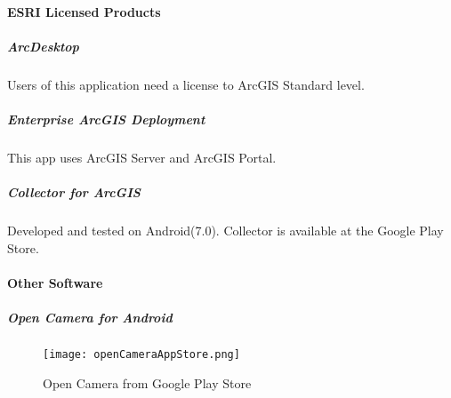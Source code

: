 \documentclass[class=article , crop=false, titlepage, twoside, multi={itemize, figure, verbatim}, float=false]{standalone}
\begin{document}
\paragraph{ESRI Licensed Products}
\subparagraph{ArcDesktop}Users of this application need a license to ArcGIS Standard level.

\subparagraph{Enterprise ArcGIS Deployment}This app uses ArcGIS Server and ArcGIS Portal.

\subparagraph{Collector for ArcGIS}Developed and tested on Android(7.0).  Collector is available at the Google Play Store.

\paragraph{Other Software}

\subparagraph{Open Camera for Android}

\begin{figure}[h!]
\centering
    \texttt{[image: openCameraAppStore.png]}
\caption{Open Camera from Google Play Store}
\end{figure}
\end{document}
